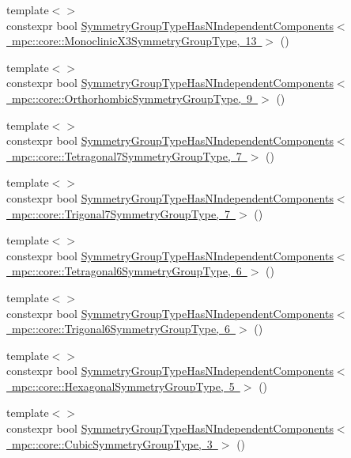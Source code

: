 \begin{DoxyCompactItemize}
\item 
{\footnotesize template$<$$>$ }\\constexpr bool \mbox{\hyperlink{namespacempc_1_1core_a9169add78bd6de588a7274cfc7411e6d}{Symmetry\+Group\+Type\+Has\+N\+Independent\+Components$<$ mpc\+::core\+::\+Monoclinic\+X3\+Symmetry\+Group\+Type, 13 $>$}} ()
\item 
{\footnotesize template$<$$>$ }\\constexpr bool \mbox{\hyperlink{namespacempc_1_1core_a6ccdda697e75eb6823ed1a501ec13fa1}{Symmetry\+Group\+Type\+Has\+N\+Independent\+Components$<$ mpc\+::core\+::\+Orthorhombic\+Symmetry\+Group\+Type, 9 $>$}} ()
\item 
{\footnotesize template$<$$>$ }\\constexpr bool \mbox{\hyperlink{namespacempc_1_1core_a5879a998916b1a3098f83a1e64911589}{Symmetry\+Group\+Type\+Has\+N\+Independent\+Components$<$ mpc\+::core\+::\+Tetragonal7\+Symmetry\+Group\+Type, 7 $>$}} ()
\item 
{\footnotesize template$<$$>$ }\\constexpr bool \mbox{\hyperlink{namespacempc_1_1core_a9d9122afa0af51479a4dec2d2d8c68a6}{Symmetry\+Group\+Type\+Has\+N\+Independent\+Components$<$ mpc\+::core\+::\+Trigonal7\+Symmetry\+Group\+Type, 7 $>$}} ()
\item 
{\footnotesize template$<$$>$ }\\constexpr bool \mbox{\hyperlink{namespacempc_1_1core_aaa99a161d476fdf2e9221868cf4bcf25}{Symmetry\+Group\+Type\+Has\+N\+Independent\+Components$<$ mpc\+::core\+::\+Tetragonal6\+Symmetry\+Group\+Type, 6 $>$}} ()
\item 
{\footnotesize template$<$$>$ }\\constexpr bool \mbox{\hyperlink{namespacempc_1_1core_a5481798f15b70cec912d03a7bbc49bb4}{Symmetry\+Group\+Type\+Has\+N\+Independent\+Components$<$ mpc\+::core\+::\+Trigonal6\+Symmetry\+Group\+Type, 6 $>$}} ()
\item 
{\footnotesize template$<$$>$ }\\constexpr bool \mbox{\hyperlink{namespacempc_1_1core_abbbc369dc0ab18f2055c74b2e83a2309}{Symmetry\+Group\+Type\+Has\+N\+Independent\+Components$<$ mpc\+::core\+::\+Hexagonal\+Symmetry\+Group\+Type, 5 $>$}} ()
\item 
{\footnotesize template$<$$>$ }\\constexpr bool \mbox{\hyperlink{namespacempc_1_1core_a19d52494997193d25a84c367400e8993}{Symmetry\+Group\+Type\+Has\+N\+Independent\+Components$<$ mpc\+::core\+::\+Cubic\+Symmetry\+Group\+Type, 3 $>$}} ()

\end{DoxyCompactItemize}

